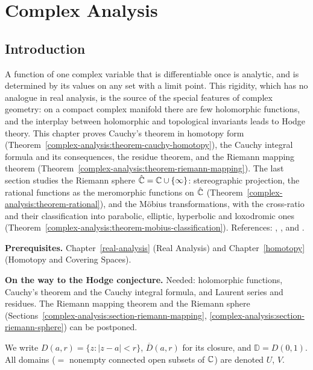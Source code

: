 \chapter{Complex Analysis}\label{complex-analysis}

\section{Introduction}\label{complex-analysis:section-introduction}

A function of one complex variable that is differentiable once is analytic, and is determined by its values on any set with a limit
point. This rigidity, which has no analogue in real analysis, is the source of the special features of complex geometry: on a compact
complex manifold there are few holomorphic functions, and the interplay between holomorphic and topological invariants leads to Hodge
theory. This chapter proves Cauchy's theorem in homotopy form (Theorem~\ref{complex-analysis:theorem-cauchy-homotopy}), the Cauchy
integral formula and its consequences, the residue theorem, and the Riemann mapping theorem
(Theorem~\ref{complex-analysis:theorem-riemann-mapping}). The last section studies the Riemann sphere $\hat{\mathbb{C}} = \mathbb{C} \cup \{\infty\}$: stereographic
projection, the rational functions as the meromorphic functions on $\hat{\mathbb{C}}$ (Theorem~\ref{complex-analysis:theorem-rational}), and the M\"obius transformations, with the
cross-ratio and their classification into parabolic, elliptic, hyperbolic and loxodromic ones (Theorem~\ref{complex-analysis:theorem-mobius-classification}). References: \cite{ahlfors-complex}, \cite{stein-shakarchi-complex},
\cite{conway-complex} and \cite[Chapters 10--16]{rudin-rca}.

\noindent\textbf{Prerequisites.} Chapter~\ref{real-analysis} (Real Analysis) and Chapter~\ref{homotopy} (Homotopy and Covering Spaces).

\noindent\textbf{On the way to the Hodge conjecture.} Needed: holomorphic functions, Cauchy's theorem and the Cauchy integral formula, and Laurent series and residues. The Riemann mapping theorem
and the Riemann sphere (Sections~\ref{complex-analysis:section-riemann-mapping}, \ref{complex-analysis:section-riemann-sphere}) can be postponed.

We write $D(a, r) = \{z : |z - a| < r\}$, $\overline{D}(a, r)$ for its closure, and $\mathbb{D} = D(0, 1)$. All domains ($=$ nonempty connected
open subsets of $\mathbb{C}$) are denoted $U$, $V$.

